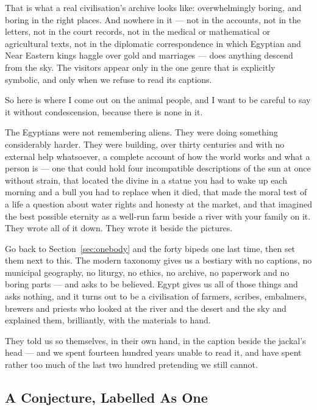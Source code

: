 That is what a real civilisation's archive looks like: overwhelmingly boring, and boring in the
right places. And nowhere in it --- not in the accounts, not in the letters, not in the court
records, not in the medical or mathematical or agricultural texts, not in the diplomatic
correspondence in which Egyptian and Near Eastern kings haggle over gold and marriages --- does
anything descend from the sky. The visitors appear only in the one genre that is explicitly
symbolic, and only when we refuse to read its captions.

So here is where I come out on the animal people, and I want to be careful to say it without
condescension, because there is none in it.

The Egyptians were not remembering aliens. They were doing something considerably harder. They
were building, over thirty centuries and with no external help whatsoever, a complete account of
how the world works and what a person is --- one that could hold four incompatible descriptions of
the sun at once without strain, that located the divine in a statue you had to wake up each
morning and a bull you had to replace when it died, that made the moral test of a life a question
about water rights and honesty at the market, and that imagined the best possible eternity as a
well-run farm beside a river with your family on it. They wrote all of it down. They wrote it
beside the pictures.

Go back to Section~\ref{sec:onebody} and the forty bipeds one last time, then set them
next to this. The modern taxonomy gives us a bestiary with no captions, no municipal geography, no
liturgy, no ethics, no archive, no paperwork and no boring parts --- and asks to be believed. Egypt
gives us all of those things and asks nothing, and it turns out to be a civilisation of farmers,
scribes, embalmers, brewers and priests who looked at the river and the desert and the sky and
explained them, brilliantly, with the materials to hand.

 They told us so themselves, in their own hand, in the caption
beside the jackal's head --- and we spent fourteen hundred years unable to read it, and have spent
rather too much of the last two hundred pretending we still cannot.


\subsection{A Conjecture, Labelled As One}\label{sec:literalconjecture}

